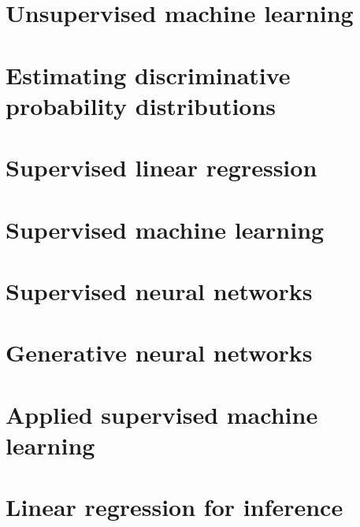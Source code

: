 \documentclass[oneside]{book}
\begin{document}
\part{Unsupervised machine learning}



\part{Estimating discriminative probability distributions}





\part{Supervised linear regression}





\part{Supervised machine learning}









\part{Supervised neural networks}




\part{Generative neural networks}





\part{Applied supervised machine learning}





\part{Linear regression for inference}





\end{document}

